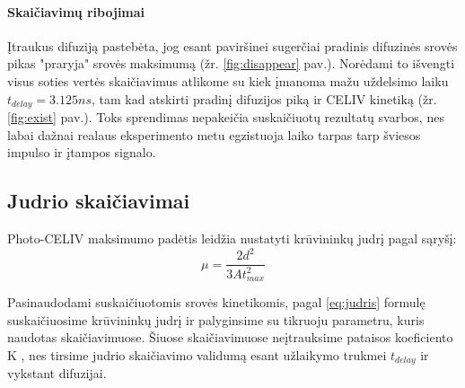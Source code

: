 \paragraph{Skaičiavimų ribojimai}
\label{page:limits}
Įtraukus difuziją pastebėta, jog esant paviršinei sugerčiai pradinis difuzinės srovės pikas "praryja" srovės maksimumą (žr. \ref{fig:disappear} pav.).
Norėdami to išvengti visus soties vertės skaičiavimus atlikome su kiek įmanoma mažu uždelsimo laiku $t_{delay} = 3.125ns$, tam kad atskirti pradinį difuzijos piką ir CELIV kinetiką (žr. \ref{fig:exist} pav.). Toks sprendimas nepakeičia suskaičiuotų rezultatų svarbos, nes labai dažnai realaus eksperimento metu egzistuoja laiko tarpas tarp šviesos impulso ir įtampos signalo.

\subsection{Judrio skaičiavimai}
Photo-CELIV maksimumo padėtis leidžia nustatyti krūvininkų judrį pagal sąryšį:
\begin{equation}
\label{eq:judris}
\mu = \frac{2d^2}{3At_{max}^2}
\end{equation}

Pasinaudodami suskaičiuotomis srovės kinetikomis, pagal \eqref{eq:judris} formulę suskaičiuosime krūvininkų judrį ir palyginsime su tikruoju parametru, kuris naudotas skaičiavimuose. Šiuose skaičiavimuose neįtrauksime pataisos koeficiento K \cite{juška:155202}, nes tirsime judrio skaičiavimo validumą esant užlaikymo trukmei $t_{delay}$ ir vykstant difuzijai.

